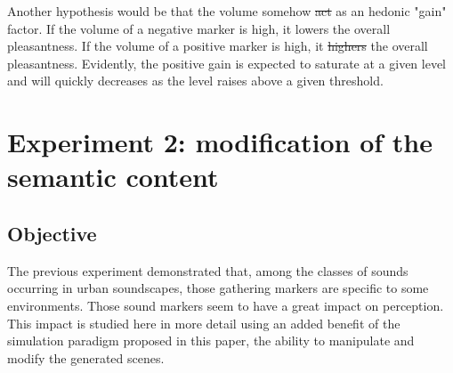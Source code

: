 \documentclass[12pt]{elsarticle}
\providecommand{\DIFadd}[1]{{\protect\color{blue}\uwave{#1}}} %
\providecommand{\DIFdel}[1]{{\protect\color{red}\sout{#1}}}                      %
\providecommand{\DIFaddbegin}{} %
\providecommand{\DIFaddend}{} %
\providecommand{\DIFdelbegin}{} %
\providecommand{\DIFdelend}{} %
\begin{document}
Another hypothesis would be that the volume somehow \DIFdelbegin \DIFdel{act }\DIFdelend \DIFaddbegin \DIFadd{acts }\DIFaddend as an hedonic "gain" factor. If the volume of a negative marker is high, it lowers the overall pleasantness. If the volume of a positive marker is high, it \DIFdelbegin \DIFdel{highers }\DIFdelend \DIFaddbegin \DIFadd{increases }\DIFaddend the overall pleasantness. Evidently, the positive gain is expected to saturate at a given level and will quickly decreases as the level raises above a given threshold.


\section{Experiment 2: modification of the semantic content}
\label{sec:modification}

\subsection{Objective}

\DIFaddbegin 

\DIFaddend %

The previous experiment demonstrated that, among the classes of sounds occurring in urban soundscapes, those gathering markers are specific to some environments. Those sound markers seem to have a great impact on perception. This impact is studied here in more detail using an added benefit of the simulation paradigm proposed in this paper, the ability to manipulate and modify the generated scenes.
\end{document}
